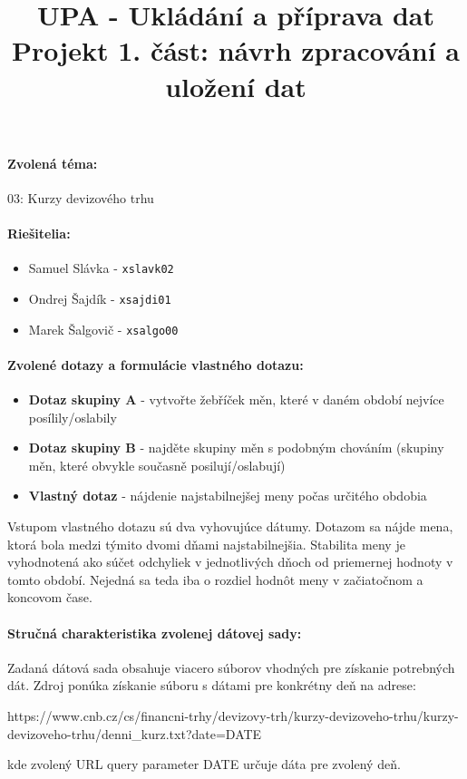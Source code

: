 \documentclass[]{article}
\title{UPA  - Ukládání a příprava dat \\ Projekt 1. část: návrh zpracování a uložení dat}
\date{\vspace{-9ex}}
\begin{document}
\maketitle



\paragraph{Zvolená téma:}

03: Kurzy devizového trhu 
\paragraph{Riešitelia:}
\begin{itemize}
\item Samuel Slávka - \texttt{xslavk02} \item Ondrej Šajdík - \texttt{xsajdi01} \item Marek Šalgovič - \texttt{xsalgo00}
\end{itemize}

 \paragraph{Zvolené dotazy a formulácie vlastného dotazu:}

\begin{itemize}
\item \textbf{Dotaz skupiny A} - vytvořte žebříček měn, které v daném období nejvíce posílily/oslabily
\item \textbf{Dotaz skupiny B} - najděte skupiny měn s podobným chováním (skupiny měn, které obvykle současně posilují/oslabují)
\item \textbf{Vlastný dotaz} - nájdenie najstabilnejšej meny počas určitého obdobia
\end{itemize}

Vstupom vlastného dotazu sú dva vyhovujúce dátumy. Dotazom sa nájde mena, ktorá bola medzi týmito dvomi dňami najstabilnejšia. Stabilita meny je vyhodnotená ako súčet odchyliek v jednotlivých dňoch od priemernej hodnoty v tomto období. Nejedná sa teda iba o rozdiel hodnôt meny v začiatočnom a koncovom čase.

\paragraph{Stručná charakteristika zvolenej dátovej sady:}

Zadaná dátová sada obsahuje viacero súborov vhodných pre získanie potrebných dát. Zdroj ponúka získanie súboru s dátami pre konkrétny deň na adrese: 
\begin{center}
 https://www.cnb.cz/cs/financni-trhy/devizovy-trh/kurzy-devizoveho-trhu/kurzy-devizoveho-trhu/denni\_kurz.txt?date=DATE
 \end{center}
  kde zvolený URL query parameter DATE určuje dáta pre zvolený deň.
  
\end{document}
